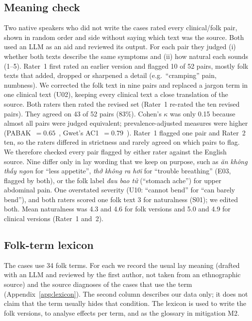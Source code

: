 \documentclass[runningheads]{llncs}
\newcommand{\vi}[1]{\textit{#1}}   %
\begin{document}
\subsection{Meaning check}\label{sec:meaning}
Two native speakers who did not write the cases rated every clinical/folk pair, shown in random order and side without saying which text was the source. Both used an LLM as an aid and reviewed its output. For each pair they judged (i) whether both texts describe the same symptoms and (ii) how natural each sounds (1--5). Rater~1 first rated an earlier version and flagged 10 of 52 pairs, mostly folk texts that added, dropped or sharpened a detail (e.g.\ ``cramping'' pain, numbness). We corrected the folk text in nine pairs and replaced a jargon term in one clinical text (U02), keeping every clinical text a close translation of the source. Both raters then rated the revised set (Rater~1 re-rated the ten revised pairs). They agreed on 43 of 52 pairs (83\%). Cohen's $\kappa$ was only 0.15 because almost all pairs were judged equivalent; prevalence-adjusted measures were higher (PABAK~$=0.65$~\cite{byrt1993bias}, Gwet's AC1~$=0.79$~\cite{gwet2008ac1}). Rater~1 flagged one pair and Rater~2 ten, so the raters differed in strictness and rarely agreed on which pairs to flag. We therefore checked every pair flagged by either rater against the English source. Nine differ only in lay wording that we keep on purpose, such as \vi{ăn không thấy ngon} for ``less appetite'', \vi{thở không ra hơi} for ``trouble breathing'' (E03, flagged by both), or the folk label \vi{đau bao tử} (``stomach ache'') for upper abdominal pain. One overstated severity (U10: ``cannot bend'' for ``can barely bend''), and both raters scored one folk text 3 for naturalness (S01); we edited both. Mean naturalness was 4.3 and 4.6 for folk versions and 5.0 and 4.9 for clinical versions (Rater~1 and~2).

\subsection{Folk-term lexicon}
The cases use 34 folk terms. For each we record the usual lay meaning (drafted with an LLM and reviewed by the first author, not taken from an ethnographic source) and the source diagnoses of the cases that use the term (Appendix~\ref{app:lexicon}). The second column describes our data only; it does not claim that the term usually hides that condition. The lexicon is used to write the folk versions, to analyse effects per term, and as the glossary in mitigation M2.
\end{document}
